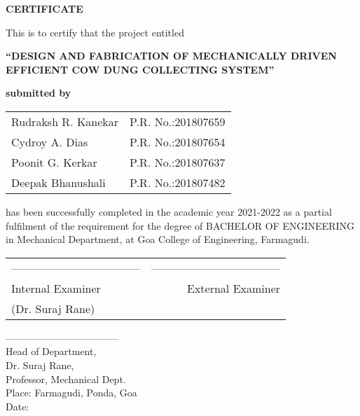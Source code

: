 \begin{center}
\begin{Huge}
{\bfseries CERTIFICATE}\\
\end{Huge}
\vspace{1cm}
{\normalsize This is to certify that the project entitled}\\
\vspace{0.3cm}
\begin{large}
{\bfseries ``DESIGN AND FABRICATION OF MECHANICALLY DRIVEN\\EFFICIENT COW DUNG COLLECTING SYSTEM''}\\
\end{large}
\vspace{0.3cm}
{\bfseries submitted by}\\
\vspace{0.8cm}
\begin{table}[H]
\normalsize
\bfseries
\begin{center}
\begin{tabular}{ll}
Rudraksh R. Kanekar \hspace{1cm} & P.R. No.:201807659\\
Cydroy A. Dias & P.R. No.:201807654\\
Poonit G. Kerkar & P.R. No.:201807637\\
Deepak Bhanushali & P.R. No.:201807482\\
\end{tabular}
\end{center}
\end{table}
\end{center}
\noindent has been successfully completed in the academic year 2021-2022 as a partial fulfilment of the requirement for the degree of BACHELOR OF ENGINEERING in Mechanical Department, at Goa College of Engineering, Farmagudi.\\
\vspace{1.3cm}
\begin{table}[H]
\begin{tabular}{lr}
\noindent ----------------------------------- & \hspace{6cm} ----------------------------------- \\
Internal Examiner & External Examiner\\
(Dr. Suraj Rane)&\\
\end{tabular}
\end{table}
\noindent -----------------------------------\\
Head of Department,\\
Dr. Suraj Rane,\\
Professor, Mechanical Dept.\\

\vspace{0.9cm}
\noindent Place: Farmagudi, Ponda, Goa\\
\noindent Date: 